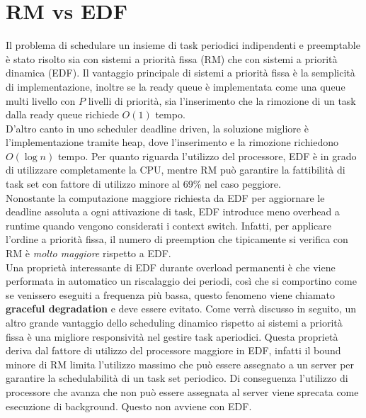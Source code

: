 \documentclass[12pt,openany,onesided]{book}
\begin{document}
\section{RM vs EDF}
Il problema di schedulare un insieme di task periodici indipendenti e preemptable è stato risolto sia con sistemi a priorità fissa (RM) che con sistemi a priorità dinamica (EDF).
Il vantaggio principale di sistemi a priorità fissa è la semplicità di implementazione, inoltre se la ready queue è implementata come una queue multi livello con $P$ livelli di priorità,
sia l'inserimento che la rimozione di un task dalla ready queue richiede $O(1)$ tempo.
\\
D'altro canto in uno scheduler deadline driven, la soluzione migliore è l'implementazione tramite heap, dove l'inserimento e la rimozione richiedono $O(\log n)$ tempo.
Per quanto riguarda l'utilizzo del processore, EDF è in grado di utilizzare completamente la CPU, mentre RM può garantire la fattibilità di task set con fattore di utilizzo minore al 69\% nel caso peggiore.
\\
Nonostante la computazione maggiore richiesta da EDF per aggiornare le deadline assoluta a ogni attivazione di task, EDF introduce meno overhead a runtime quando vengono considerati i context switch.
Infatti, per applicare l'ordine a priorità fissa, il numero di preemption che tipicamente si verifica con RM è \textit{molto maggiore} rispetto a EDF.
\\
Una proprietà interessante di EDF durante overload permanenti è che viene performata in automatico un riscalaggio dei periodi, così che si comportino come se venissero eseguiti a frequenza più bassa, questo fenomeno viene chiamato \textbf{graceful degradation} e deve essere evitato.
Come verrà discusso in seguito, un altro grande vantaggio dello scheduling dinamico rispetto ai sistemi a priorità fissa è una migliore responsività nel gestire task aperiodici.
Questa proprietà deriva dal fattore di utilizzo del processore maggiore in EDF, infatti il bound minore di RM limita l'utilizzo massimo che può essere assegnato a un server per garantire la schedulabilità di un task set periodico.
Di conseguenza l'utilizzo di processore che avanza che non può essere assegnata al server viene sprecata come esecuzione di background.
Questo non avviene con EDF.
\end{document}
